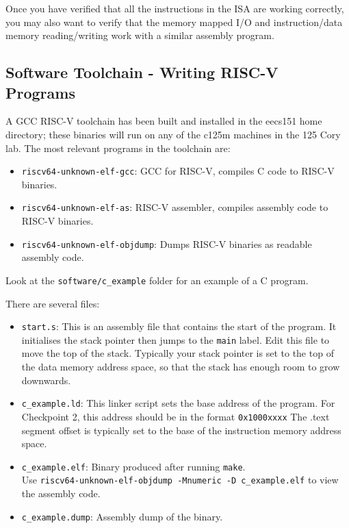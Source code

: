 \documentclass[11pt]{article}
\begin{document}
Once you have verified that all the instructions in the ISA are working correctly, you may also want to verify that the memory mapped I/O and instruction/data memory reading/writing work with a similar assembly program.

\subsection{Software Toolchain - Writing RISC-V Programs}
\label{toolchain}
A GCC RISC-V toolchain has been built and installed in the eecs151 home directory; these binaries will run on any of the c125m machines in the 125 Cory lab.
The most relevant programs in the toolchain are:
\begin{itemize}
    \item \verb|riscv64-unknown-elf-gcc|: GCC for RISC-V, compiles C code to RISC-V binaries.
    \item \verb|riscv64-unknown-elf-as|: RISC-V assembler, compiles assembly code to RISC-V binaries.
    \item \verb|riscv64-unknown-elf-objdump|: Dumps RISC-V binaries as readable assembly code.
\end{itemize}

Look at the \verb|software/c_example| folder for an example of a C program.

There are several files:
\begin{itemize}
    \item \verb|start.s|: This is an assembly file that contains the start of the program.
      It initialises the stack pointer then jumps to the \verb|main| label.
      Edit this file to move the top of the stack.
      Typically your stack pointer is set to the top of the data memory address space, so that the stack has enough room to grow downwards.

    \item \verb|c_example.ld|: This linker script sets the base address of the program.
      For Checkpoint 2, this address should be in the format \verb|0x1000xxxx|
      The .text segment offset is typically set to the base of the instruction memory address space.

    \item \verb|c_example.elf|: Binary produced after running \verb|make|.\\Use \verb|riscv64-unknown-elf-objdump -Mnumeric -D c_example.elf| to view the assembly code.
    \item \verb|c_example.dump|: Assembly dump of the binary.
\end{itemize}
\end{document}
